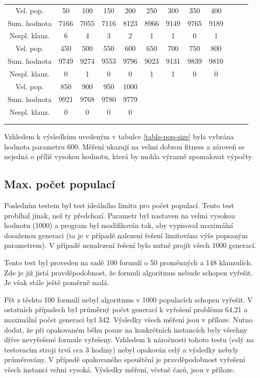 \documentclass[a4paper]{article}
\begin{document}
		\begin{tabular}{cccccccccccc} \label{table-pop-size}
		\\
		Vel. pop. & 50 & 100 & 150 & 200 & 250 & 300 & 350 & 400 \\
		Sum. hodnota & 7166&7055	&7116	&8123&	8966	&9149&	9765&	9189	\\
		Nespl. klauz.  & 6	&4&	3	&2	&1&	1	&0&	1\\
		\hline
		Vel. pop. & 450 & 500 & 550 & 600 & 650 & 700 & 750 & 800\\
		Sum. hodnota &9749&	9274	&9553	&9796&	9023&	9131&	9839&	9810\\
		Nespl. klauz. &0	&1&	0	&0	&1&	1&	0	&0 \\
		\hline
 		Vel. pop. & 850 & 900 & 950 & 1000\\
		Sum. hodnota & 9921	&9768&	9780	&9779\\
		Nespl. klauz.&	0&	0	&0&	0\\\\
		\\
		\end{tabular}
		
		Vzhledem k výsledkům uvedeným v tabulce \ref{table-pop-size} byla vybrána hodnota parametru 600. Měření ukazují na velmi dobrou fitness a zároveň se nejedná o příliš vysokou hodnotu, která by mohla výrazně zpomalovat výpočty.
	
	\subsection{Max. počet populací}
		Posledním testem byl test ideálního limitu pro počet populací. Tento test probíhal jinak, než ty předchozí. Parametr byl nastaven na velmi vysokou hodnotu (1000) a program byl modifikován tak, aby vypisoval maximální dosaženou generaci (ta je v případě nalezení řešení limitována výše popsaným parametrem). V případě nenalezení řešení bylo nutné projít všech 1000 generací.	
		
		Tento test byl proveden na sadě 100 formulí o 50 proměnných a 148 klauzulích. Zde je již jistá pravděpodobnost, že formuli algoritmus nebude schopen vyřešit. Je však stále ještě poměrně malá.
		
	Pět z těchto 100 formulí nebyl algoritmus v 1000 populacích schopen vyřešit. V ostatních případech byl průměrný počet generací k vyřešení problému 64,21 a maximální počet generací byl 342. Výsledky všech měření jsou v příloze. Nutno dodat, že při opakovaném běhu pouze na konkrétních instancích byly všechny dříve nevyřešené formule vyřešeny. Vzhledem k náročnosti tohoto testu (celý na testovacím stroji trvá cca 3 hodiny) nebyl opakován celý a výsledky nebyly průměrovány. V případě opakovaného spouštění je pravděpodobnost vyřešení všech instancí velmi vysoká. Výsledky měření, včetně časů, jsou v příloze.
	
\end{document}
